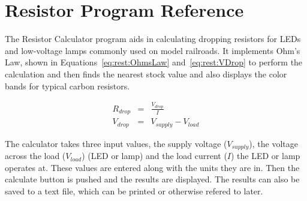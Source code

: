 
\chapter{Resistor Program Reference}
\label{chpt:rest:Reference}

The Resistor Calculator program aids in calculating dropping resistors
for LEDs and low-voltage lamps commonly used on model railroads.  It
implements Ohm's Law, shown in
Equations~\ref{eq:rest:OhmsLaw} and~\ref{eq:rest:VDrop} to perform the
calculation and then finds the nearest stock value and also displays
the color bands for typical carbon resistors.

\begin{eqnarray}
R_{drop} &=& \frac{V_{drop}}{I} \label{eq:rest:OhmsLaw} \\
V_{drop} &=& V_{supply} - V_{load} \label{eq:rest:VDrop}
\end{eqnarray}

The calculator takes three input values, the supply voltage
($V_{supply}$), the voltage across the load ($V_{load}$) (LED or lamp)
and the load current ($I$) the LED or lamp operates at.  These values
are entered along with the units they are in. Then the calculate button
is pushed and the results are displayed.  The results can also be saved
to a text file, which can be printed or otherwise refered to later.

